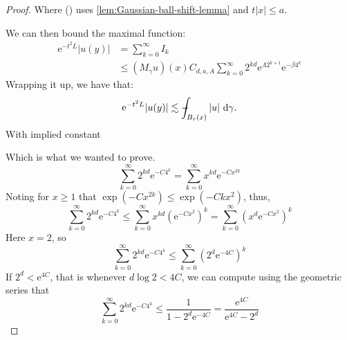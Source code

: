 \documentclass[a4paper,oneside,10pt]{amsproc}
\makeatletter
\newcommand{\hintref}[1]{\csuse{hint@#1}}
\theoremstyle{plain}
\theoremstyle{remark}
\newcommand{\D}{\,\textup{d}}
\def\Xint#1{\mathchoice
  {\XXint\displaystyle\textstyle{#1}}%
  {\XXint\textstyle\scriptstyle{#1}}%
  {\XXint\scriptstyle\scriptscriptstyle{#1}}%
  {\XXint\scriptscriptstyle\scriptscriptstyle{#1}}%
  \!\int}
\def\XXint#1#2#3{{\setbox0=\hbox{$#1{#2#3}{\int}$ }
    \vcenter{\hbox{$#2#3$ }}\kern-.535\wd0}}
\def\dashint{\Xint-}
\renewcommand{\leq}{\leqslant}
\renewcommand{\leq}{\leqslant}
\renewcommand{\geq}{\geqslant}
\newcommand{\e}{\mathrm{e}} %
\renewcommand{\leq}{\leqslant}%
\renewcommand{\geq}{\geqslant}%
\makeatother
\begin{document}
\begin{proof}
  Where (\hintref{rel1}) uses \autoref{lem:Gaussian-ball-shift-lemma}
  and $t |x| \leq a$.



  We can then bound the maximal function:
  \begin{align*}
      \e^{-t^2 L} |u(y)| &= \sum_{k = 0}^\infty I_k\\
      &\leq (M_\gamma u)(x) C_{d, a, A} \sum_{k = 0}^\infty 2^{kd} \e^{\Lambda 2^{k + 1}} \e^{-\beta 4^k}
  \end{align*}
  Wrapping it up, we have that:
  \begin{equation*}
    \e^{-t^2 L} |u(y)| \lesssim \dashint_{B_r(x)} |u| \, \D\gamma.
  \end{equation*}
  With implied constant

  Which is what we wanted to prove.
  \begin{equation*}
    \sum_{k = 0}^\infty 2^{kd} \e^{-C 4^k} = \sum_{k = 0}^\infty x^{kd} \e^{-C x^{2k}}
  \end{equation*}
  Noting for $x \geq 1$ that $\exp(-C x^{2k}) \leq \exp(-C k x^2)$,
  thus,
  \begin{equation*}
    \sum_{k = 0}^\infty 2^{kd} \e^{-C 4^k} \leq \sum_{k = 0}^\infty
    x^{kd} (\e^{-C x^2})^k = \sum_{k = 0}^\infty (x^{d} \e^{-C x^2})^k
  \end{equation*}
  Here $x = 2$, so
  \begin{equation*}
    \sum_{k = 0}^\infty 2^{kd} \e^{-C 4^k} \leq \sum_{k = 0}^\infty
    (2^d \e^{-4 C})^k
  \end{equation*}
  If $2^d < \e^{4C}$, that is whenever $d \log 2 < 4C$, we can compute
  using the geometric series that
  \begin{equation*}
    \sum_{k = 0}^\infty 2^{kd} \e^{-C 4^k} \leq \frac1{1 - 2^d
      \e^{-4C}} = \frac{\e^{4C}}{\e^{4C} - 2^d}
  \end{equation*}


\end{proof}

\printbibliography
\end{document}
